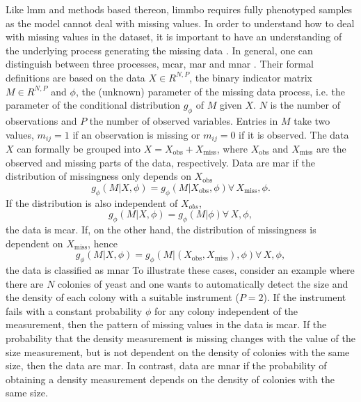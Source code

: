 Like \gls{lmm} and methods based thereon, \gls{limmbo} requires fully phenotyped samples as the model cannot deal with missing values. In order to understand how to deal with missing values in the dataset, it is important to have an understanding of the underlying process generating the missing data \citep{Rubin1976}. In general, one can distinguish between three processes, \gls{mcar}, \gls{mar} and \gls{mnar} \citep{Little2002}. Their formal definitions are based on the data \(X  \in R^{N,P}\),  the binary indicator matrix \(M  \in R^{N,P}\)  and \(\phi\), the (unknown) parameter of the missing data process, i.e. the parameter of the conditional distribution \(g_\phi\) of \(M\) given \(X\). \(N\) is the number of observations and \(P\) the number of observed variables. Entries in \(M\) take two values,  \(m_{ij} = 1 \) if an observation is missing or  \(m_{ij} = 0\) if it is observed. The data \(X\) can formally be grouped into \(X=X_\text{obs} + X_\text{miss}\), where \(X_\text{obs}\) and  \(X_\text{miss}\) are the observed and missing parts of the data, respectively. Data are \gls{mar} if the distribution of missingness only depends on \(X_{\text{obs}}\)
\begin{equation}
g_\phi(M | X, \phi) =  g_\phi(M | X_{\text{obs}}, \phi)  \forall \, X_\text{miss}, \phi.
\end{equation}
If the distribution is also independent of \(X_{obs}\), 
\begin{equation}
g_\phi(M | X, \phi) =  g_\phi(M | \phi) \forall \, X, \phi,
\end{equation}
the data is \gls{mcar}. If, on the other hand, the distribution of missingness is dependent on \(X_{\text{miss}}\), hence
\begin{equation}
g_\phi(M | X, \phi) =  g_\phi(M | (X_{\text{obs}}, X_{\text{miss}}),\phi) \forall \, X, \phi,
\end{equation}
the data is classified as \gls{mnar} To illustrate these cases, consider an example where there are \(N\) colonies of yeast and one wants to automatically detect the size and the density of each colony with a suitable instrument (\(P=2\)). If the instrument fails with a constant probability \(\phi\) for any colony independent of the measurement, then the pattern of missing values in the data is \gls{mcar}. If the probability that the density measurement is missing changes with the value of the size measurement, but is not dependent on the density of colonies with the same size, then the data are \gls{mar}. In contrast, data are \gls{mnar} if the probability of obtaining a density measurement depends on the density of colonies with the same size. 

